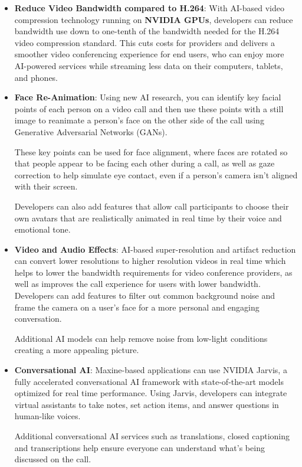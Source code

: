 \begin{itemize}
    \item \textbf{Reduce Video Bandwidth compared to H.264}: 
    With AI-based video compression technology running on \textbf{NVIDIA GPUs}, 
    developers can reduce bandwidth use down to one-tenth of the bandwidth needed 
    for the H.264 video compression standard. This cuts costs for providers and 
    delivers a smoother video conferencing experience for end users, who can enjoy 
    more AI-powered services while streaming less data on their computers, tablets, and phones.
    
    \item \textbf{Face Re-Animation}:
    Using new AI research, you can identify key facial points of each person on a video call 
    and then use these points with a still image to reanimate a person’s face on the other side 
    of the call using Generative Adversarial Networks (GANs).
    
    These key points can be used for face alignment, where faces are rotated so that
    people appear to be facing each other during a call, as well as gaze correction 
    to help simulate eye contact, even if a person’s camera isn’t aligned with their screen.
    
    Developers can also add features that allow call participants to choose their
    own avatars that are realistically animated in real time by their voice and emotional tone.

    \item \textbf{Video and Audio Effects}:
    AI-based super-resolution and artifact reduction can convert lower resolutions to higher
    resolution videos in real time which helps to lower the bandwidth requirements for video 
    conference providers, as well as improves the call experience for users with lower bandwidth. 
    Developers can add features to filter out common background noise and frame the camera on a user’s 
    face for a more personal and engaging conversation.
    
    Additional AI models can help remove noise from low-light conditions creating a more appealing picture.

    \item \textbf{Conversational AI}:
    Maxine-based applications can use NVIDIA Jarvis, a fully accelerated conversational
    AI framework with state-of-the-art models optimized for real time performance. Using Jarvis, 
    developers can integrate virtual assistants to take notes, set action items, and answer questions 
    in human-like voices.
    
    Additional conversational AI services such as translations, closed captioning and transcriptions help 
    ensure everyone can understand what’s being discussed on the call.
\end{itemize}


